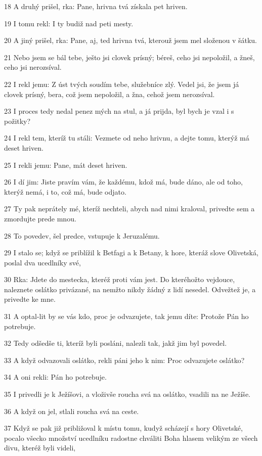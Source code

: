 \par 18 A druhý prišel, rka: Pane, hrivna tvá získala pet hriven.
\par 19 I tomu rekl: I ty budiž nad peti mesty.
\par 20 A jiný prišel, rka: Pane, aj, ted hrivna tvá, kterouž jsem mel složenou v šátku.
\par 21 Nebo jsem se bál tebe, ješto jsi clovek prísný; béreš, ceho jsi nepoložil, a žneš, ceho jsi nerozsíval.
\par 22 I rekl jemu: Z úst tvých soudím tebe, služebníce zlý. Vedel jsi, že jsem já clovek prísný, bera, což jsem nepoložil, a žna, cehož jsem nerozsíval.
\par 23 I proces tedy nedal penez mých na stul, a já prijda, byl bych je vzal i s požitky?
\par 24 I rekl tem, kteríž tu stáli: Vezmete od neho hrivnu, a dejte tomu, kterýž má deset hriven.
\par 25 I rekli jemu: Pane, mát deset hriven.
\par 26 I dí jim: Jiste pravím vám, že každému, kdož má, bude dáno, ale od toho, kterýž nemá, i to, což má, bude odjato.
\par 27 Ty pak neprátely mé, kteríž nechteli, abych nad nimi kraloval, privedte sem a zmordujte prede mnou.
\par 28 To povedev, šel predce, vstupuje k Jeruzalému.
\par 29 I stalo se; když se priblížil k Betfagi a k Betany, k hore, kteráž slove Olivetská, poslal dva ucedlníky své,
\par 30 Rka: Jdete do mestecka, kteréž proti vám jest. Do kteréhožto vejdouce, naleznete oslátko privázané, na nemžto nikdy žádný z lidí nesedel. Odvežtež je, a privedte ke mne.
\par 31 A optal-lit by se vás kdo, proc je odvazujete, tak jemu díte: Protože Pán ho potrebuje.
\par 32 Tedy odšedše ti, kteríž byli posláni, nalezli tak, jakž jim byl povedel.
\par 33 A když odvazovali oslátko, rekli páni jeho k nim: Proc odvazujete oslátko?
\par 34 A oni rekli: Pán ho potrebuje.
\par 35 I privedli je k Ježíšovi, a vloživše roucha svá na oslátko, vsadili na ne Ježíše.
\par 36 A když on jel, stlali roucha svá na ceste.
\par 37 Když se pak již približoval k místu tomu, kudyž scházejí s hory Olivetské, pocalo všecko množství ucedlníku radostne chváliti Boha hlasem velikým ze všech divu, kteréž byli videli,
